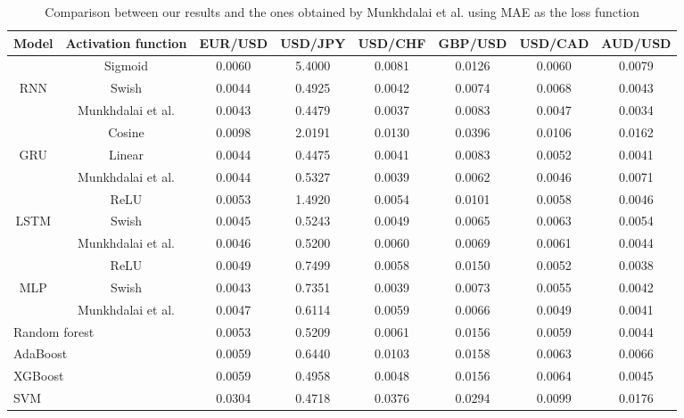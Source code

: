 \documentclass{ieeeaccess}
\begin{document}
\begin{table}[t]
  \caption{Comparison between our results and the ones obtained by Munkhdalai et al. using MAE as the loss function}
  \scriptsize
  \centering
  \begin{tabular*}{0.9\textwidth}{c @{\extracolsep{\fill}} ccccccc}
    \hline
    \textbf{Model} & \textbf{Activation function} & \textbf{EUR/USD} & \textbf{USD/JPY} & \textbf{USD/CHF} & \textbf{GBP/USD} & \textbf{USD/CAD} & \textbf{AUD/USD} \\
    \hline

          & Sigmoid & 0.0060 & 5.4000 & 0.0081 & 0.0126 & 0.0060 & 0.0079 \\
    RNN   & Swish & 0.0044 & 0.4925 & 0.0042 & 0.0074 & 0.0068 & 0.0043 \\
          & Munkhdalai et al. & 0.0043 & 0.4479 & 0.0037 & 0.0083 & 0.0047 & 0.0034 \\
    \hline
          & Cosine & 0.0098 & 2.0191 & 0.0130 & 0.0396 & 0.0106 & 0.0162 \\
    GRU   & Linear & 0.0044 & 0.4475 & 0.0041 & 0.0083 & 0.0052 & 0.0041 \\
          & Munkhdalai et al. & 0.0044 & 0.5327 & 0.0039 & 0.0062 & 0.0046 & 0.0071 \\
    \hline
          & ReLU & 0.0053 & 1.4920 & 0.0054 & 0.0101 & 0.0058 & 0.0046 \\
    LSTM  & Swish & 0.0045 & 0.5243 & 0.0049 & 0.0065 & 0.0063 & 0.0054 \\
          & Munkhdalai et al. & 0.0046 & 0.5200 & 0.0060 & 0.0069 & 0.0061 & 0.0044 \\
    \hline

          & ReLU & 0.0049 & 0.7499 & 0.0058 & 0.0150 & 0.0052 & 0.0038 \\
    MLP   & Swish & 0.0043 & 0.7351 & 0.0039 & 0.0073 & 0.0055 & 0.0042 \\
          & Munkhdalai et al. & 0.0047 & 0.6114 & 0.0059 & 0.0066 & 0.0049 & 0.0041 \\
          

    \hline

    \multicolumn{2}{l}{Random forest} & 0.0053 & 0.5209 & 0.0061 & 0.0156 & 0.0059 & 0.0044 \\
    \multicolumn{2}{l}{AdaBoost} & 0.0059 & 0.6440 & 0.0103 & 0.0158 & 0.0063 & 0.0066 \\
    \multicolumn{2}{l}{XGBoost} & 0.0059 & 0.4958 & 0.0048 & 0.0156 & 0.0064 & 0.0045 \\
    \multicolumn{2}{l}{SVM} & 0.0304 & 0.4718 & 0.0376 & 0.0294 & 0.0099 & 0.0176 \\


\end{tabular*}
\end{table}
\end{document}
